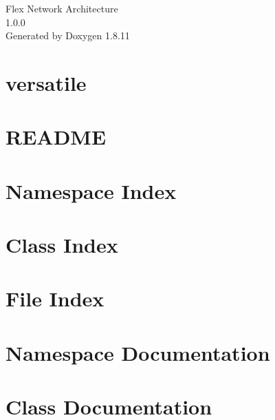 \documentclass[twoside]{book}
\newcommand{\+}{\discretionary{\mbox{\scriptsize$\hookleftarrow$}}{}{}}
\newcommand{\clearemptydoublepage}{%
  \newpage{\pagestyle{empty}\cleardoublepage}%
}
\begin{document}
\hypersetup{pageanchor=false,
             bookmarksnumbered=true,
             pdfencoding=unicode
            }
\begin{titlepage}
\vspace*{7cm}
\begin{center}%
{\Large Flex Network Architecture \\[1ex]\large 1.\+0.\+0 }\\
\vspace*{1cm}
{\large Generated by Doxygen 1.8.11}\\
\end{center}
\end{titlepage}
\clearemptydoublepage
\tableofcontents
\clearemptydoublepage
{}
\hypersetup{pageanchor=true}

\chapter{versatile}
\label{md_README}
\hypertarget{md_README}{}

\chapter{R\+E\+A\+D\+ME}
\label{md_socket_README}
\hypertarget{md_socket_README}{}

\chapter{Namespace Index}

\chapter{Class Index}

\chapter{File Index}

\chapter{Namespace Documentation}





\chapter{Class Documentation}



















\end{document}
